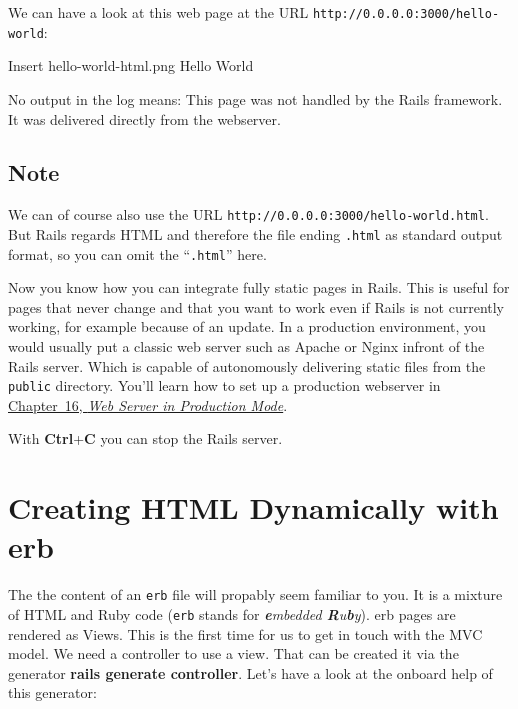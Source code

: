 \documentclass[a4paper]{book}
\newcommand{\chap}[1]{\newpage\thispagestyle{empty}\chapter{#1}\label{chap:\thechapter}}
\begin{document}
We can have a look at this web page at the URL \texttt{http://0.0.0.0:3000/hello-world}:

Insert hello-world-html.png Hello World

No output in the log means: This page was not handled by the Rails framework. It was delivered directly from the webserver.

\section{Note}\label{note-14}

We can of course also use the URL \texttt{http://0.0.0.0:3000/hello-world.html}. But Rails regards HTML and therefore the file ending \texttt{.html} as standard output format, so you can omit the “\texttt{.html}” here.

Now you know how you can integrate fully static pages in Rails. This is useful for pages that never change and that you want to work even if Rails is not currently working, for example because of an update. In a production environment, you would usually put a classic web server such as Apache or Nginx infront of the Rails server. Which is capable of autonomously delivering static files from the \texttt{public} directory. You'll learn how to set up a production webserver in \hyperref[railsux5fproductionux5fwebserver]{Chapter~16, \emph{Web Server in Production Mode}}.

With \textbf{Ctrl}+\textbf{C} you can stop the Rails server.

\chap{Creating HTML Dynamically with erb}\label{creating-html-dynamically-with-erb}

The the content of an \texttt{erb} file will propably seem familiar to you. It is a mixture of HTML and Ruby code (\texttt{erb} stands for \emph{\textbf{e}mbedded \textbf{R}u\textbf{b}y}). erb pages are rendered as Views. This is the first time for us to get in touch with the MVC model. We need a controller to use a view. That can be created it via the generator \textbf{rails generate controller}. Let's have a look at the onboard help of this generator:
\end{document}
